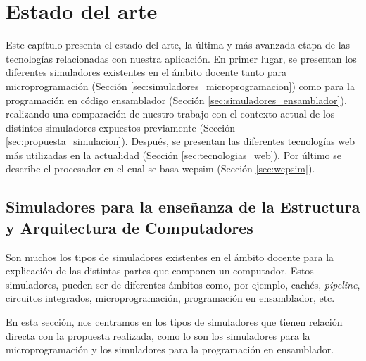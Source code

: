 \chead[]{}
\renewcommand{\headrulewidth}{0.5pt}

\lfoot[]{}
\cfoot[]{}
\rfoot[]{}
\renewcommand{\footrulewidth}{0pt}

\chapter{Estado del arte}
\label{ch:state_of_the_art}

Este capítulo presenta el estado del arte, la última y más avanzada etapa de las tecnologías relacionadas con nuestra aplicación. En primer lugar, se presentan los diferentes simuladores existentes en el ámbito docente tanto para microprogramación (Sección \ref{sec:simuladores_microprogramacion}) como para la programación en código \gls{ensamblador} (Sección \ref{sec:simuladores_ensamblador}), realizando una comparación de nuestro trabajo con el contexto actual de los distintos simuladores expuestos previamente (Sección \ref{sec:propuesta_simulacion}). Después, se presentan las diferentes tecnologías web más utilizadas en la actualidad (Sección \ref{sec:tecnologias_web}). Por último se describe el procesador en el cual se basa \acrshort{wepsim} (Sección \ref{sec:wepsim}).

\section{Simuladores para la enseñanza de la Estructura y Arquitectura de Computadores}

Son muchos los tipos de simuladores existentes en el ámbito docente para la explicación de las distintas partes que componen un computador. Estos simuladores, pueden ser de diferentes ámbitos como, por ejemplo, cachés, \emph{pipeline}, circuitos integrados, microprogramación, programación en \gls{ensamblador}, etc.

En esta sección, nos centramos en los tipos de simuladores que tienen relación directa con la propuesta realizada, como lo son los simuladores para la microprogramación y los simuladores para la programación en \gls{ensamblador}.


